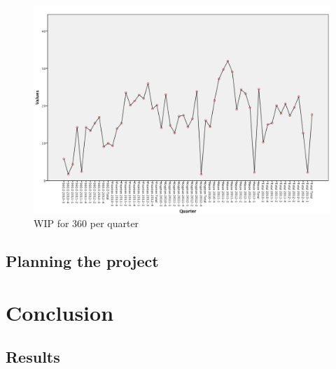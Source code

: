 \documentclass[UKenglish]{ifimaster}  %
\begin{document}
\begin{figure}[!htbp]
\centering
\includegraphics[width=\textwidth,height=\textheight,keepaspectratio]{Picture/All_WIP.jpg}
\caption{WIP for 360 per quarter}
\label{W360pq} %
\end{figure}



\chapter{Planning the project}        %


\part{Conclusion}                     %

\chapter{Results}                     %


\backmatter{}
\printbibliography
\end{document}
